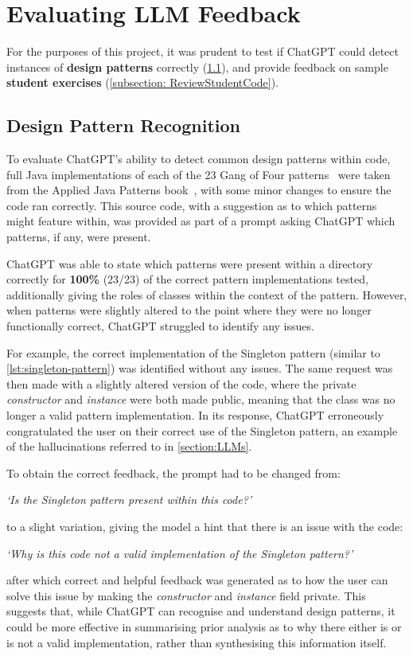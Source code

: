 \section{Evaluating LLM Feedback}

For the purposes of this project, it was prudent to test if ChatGPT could detect instances of \textbf{design patterns} correctly (\cref{subsection:DPR}), and provide feedback on sample \textbf{student exercises} (\cref{subsection: ReviewStudentCode}).

\subsection{Design Pattern Recognition}
\label{subsection:DPR}
To evaluate ChatGPT's ability to detect common design patterns within code, full Java implementations of each of the 23 Gang of Four patterns~\cite{GangOfFour} were taken from the Applied Java Patterns book~\cite{AppliedJavaPatterns}, with some minor changes to ensure the code ran correctly. This source code, with a suggestion as to which patterns might feature within, was provided as part of a prompt asking ChatGPT which patterns, if any, were present. 

ChatGPT was able to state which patterns were present within a directory correctly for \textbf{100\%} (23/23) of the correct pattern implementations tested, additionally giving the roles of classes within the context of the pattern. However, when patterns were slightly altered to the point where they were no longer functionally correct, ChatGPT struggled to identify any issues. 

For example, the correct implementation of the Singleton pattern (similar to \cref{lst:singleton-pattern}) was identified without any issues. The same request was then made with a slightly altered version of the code, where the private \emph{constructor} and \emph{instance} were both made public, meaning that the class was no longer a valid pattern implementation. In its response, ChatGPT erroneously congratulated the user on their correct use of the Singleton pattern, an example of the hallucinations referred to in \cref{section:LLMs}.

To obtain the correct feedback, the prompt had to be changed from:
\begin{center}
    \textit{`Is the Singleton pattern present within this code?'} 
\end{center}
to a slight variation, giving the model a hint that there is an issue with the code: 
\begin{center}
    \textit{`Why is this code not a valid implementation of the Singleton pattern?'}
\end{center}
after which correct and helpful feedback was generated as to how the user can solve this issue by making the \emph{constructor} and \emph{instance} field private. This suggests that, while ChatGPT can recognise and understand design patterns, it could be more effective in summarising prior analysis as to why there either is or is not a valid implementation, rather than synthesising this information itself.

